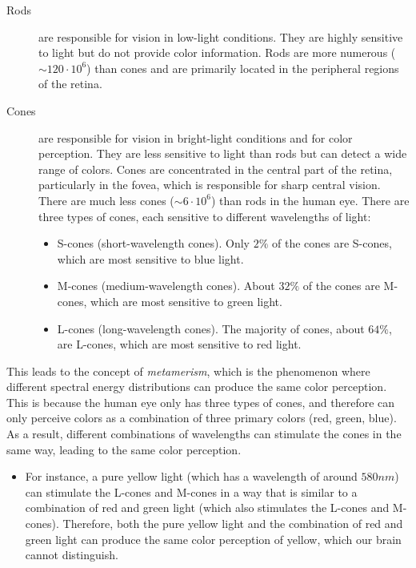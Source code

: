 \begin{description}
    \item[Rods] are responsible for vision in low-light conditions. They are highly sensitive to light but do not provide color information. Rods are more numerous ($\sim 120\cdot 10^6$) than cones and are primarily located in the peripheral regions of the retina.
    \item[Cones] are responsible for vision in bright-light conditions and for color perception. They are less sensitive to light than rods but can detect a wide range of colors. Cones are concentrated in the central part of the retina, particularly in the fovea, which is responsible for sharp central vision. There are much less cones ($\sim 6\cdot 10^6$) than rods in the human eye. There are three types of cones, each sensitive to different wavelengths of light:
    \begin{itemize}
        \item S-cones (short-wavelength cones). Only $2\%$ of the cones are S-cones, which are most sensitive to blue light.
        \item M-cones (medium-wavelength cones). About $32\%$ of the cones are M-cones, which are most sensitive to green light.
        \item L-cones (long-wavelength cones). The majority of cones, about $64\%$, are L-cones, which are most sensitive to red light.
    \end{itemize}
\end{description}

This leads to the concept of \emph{metamerism}, which is the phenomenon where different spectral energy distributions can produce the same color perception. This is because the human eye only has three types of cones, and therefore can only perceive colors as a combination of three primary colors (red, green, blue). As a result, different combinations of wavelengths can stimulate the cones in the same way, leading to the same color perception.
\begin{itemize}
    \item For instance, a pure yellow light (which has a wavelength of around $\unit{580}{nm}$) can stimulate the L-cones and M-cones in a way that is similar to a combination of red and green light (which also stimulates the L-cones and M-cones). Therefore, both the pure yellow light and the combination of red and green light can produce the same color perception of yellow, which our brain cannot distinguish.
\end{itemize}

